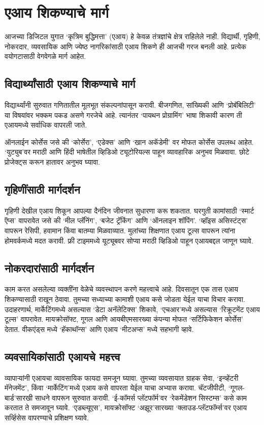 \chapter{एआय शिकण्याचे मार्ग}

आजच्या डिजिटल युगात `कृत्रिम बुद्धिमत्ता' (एआय) हे केवळ तंत्रज्ञांचे क्षेत्र राहिलेले नाही. विद्यार्थी, गृहिणी, नोकरदार, व्यवसायिक आणि ज्येष्ठ नागरिकांसाठी एआय शिकणे ही आजची गरज बनली आहे. प्रत्येक वयोगटासाठी वेगवेगळे मार्ग आहेत.

\section*{विद्यार्थ्यांसाठी एआय शिकण्याचे मार्ग}

विद्यार्थ्यांनी सुरुवात गणितातील मूलभूत संकल्पनांपासून करावी. बीजगणित, सांख्यिकी आणि `प्रोबॅबिलिटी' या विषयांवर भक्कम पकड असणे गरजेचे आहे. त्यानंतर `पायथन प्रोग्रामिंग' भाषा शिकावी कारण ती एआयमध्ये सर्वाधिक वापरली जाते.

ऑनलाईन कोर्सेस जसे की `कोर्सेरा', `एडेक्स'  आणि `खान अकॅडेमी' वर मोफत कोर्सेस उपलब्ध आहेत. `युट्युब'वर मराठी आणि हिंदी भाषेतील व्हिडिओ ट्यूटोरियल्स पाहून व्यावहारिक अनुभव मिळवावा. छोटे प्रोजेक्ट्स करून हातावर अनुभव घ्यावा.

\section*{गृहिणींसाठी  मार्गदर्शन}
गृहिणी देखील एआय शिकून आपल्या दैनंदिन जीवनात सुधारणा करू शकतात. घरगुती कामांसाठी `स्मार्ट ऍप्स' वापरावेत जसे की `मील प्लॅनिंग', `बजेट ट्रॅकिंग' आणि `ऑनलाइन शॉपिंग'. `व्हॉइस असिस्टंट्स' वापरून रेसिपी, हवामान किंवा बातम्या मिळवाव्यात. मुलांच्या शिक्षणात एआय टूल्स वापरून त्यांना होमवर्कमध्ये मदत करावी. फ्री टाइममध्ये यूट्यूबवर सोप्या मराठी व्हिडिओ पाहून एआयबद्दल जाणून घ्यावे.

\section*{नोकरदारांसाठी मार्गदर्शन}
काम करत असलेल्या व्यक्तींना वेळेचे व्यवस्थापन करणे महत्त्वाचे आहे. दिवसातून एक तास एआय शिकण्यासाठी राखून ठेवावा. तुमच्या सध्याच्या कामाशी एआय कसे जोडता येईल याचा विचार करावा.
उदाहरणार्थ, मार्केटिंगमध्ये असल्यास `डेटा अनॅलेटिक्स' शिकावे, `एचआर'मध्ये असल्यास `रिक्रूटमेंट एआय टूल्स' वापरावेत. मायक्रोसॉफ्ट, गूगल आणि आयबीएमसारख्या कंपन्या मोफत `सर्टिफिकेशन कोर्सेस' देतात. वीकएंड्स मध्ये `हॅकाथॉन्स' आणि एआय `मीटअप्स' मध्ये सहभागी व्हावे.

\section*{व्यवसायिकांसाठी एआयचे महत्त्व}
व्यापार्‍यांनी एआयचा व्यावसायिक फायदा समजून घ्यावा. तुमच्या व्यवसायात ग्राहक सेवा, `इन्व्हेंटरी मॅनेजमेंट', किंवा `मार्केटिंग'मध्ये एआय कसे वापरता येईल याचा अभ्यास करावा.
चॅटजीपीटी, `गूगल-बार्ड'सारखी साधने वापरून सुरुवात करावी. `ई-कॉमर्स प्लॅटफॉर्म'वर `रेकमेंडेशन सिस्टम्स' कसे काम करतात ते समजावून घ्यावे. `एडब्ल्यूएस', मायक्रोसॉफ्ट `अझूर'सारख्या `क्लाउड-प्लॅटफॉर्म्स'वर एआय सर्व्हिसेस वापरण्याचे प्रशिक्षण घ्यावे.

